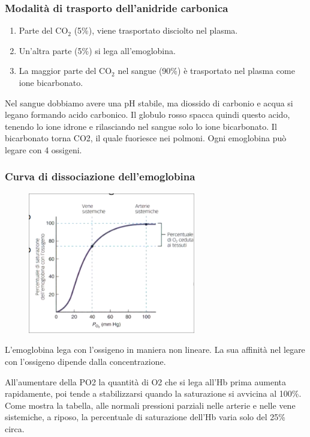 \documentclass[a4paper]{article}
\begin{document}
\subsubsection{Modalità di trasporto dell'anidride carbonica}

\begin{enumerate}
    \item Parte del CO\({}_2\) (5\%), viene trasportato disciolto nel plasma.
    \item Un'altra parte (5\%) si lega all'emoglobina.
    \item La maggior parte del CO\({}_2\) nel sangue (90\%) è trasportato nel plasma come ione bicarbonato. 
\end{enumerate}

Nel sangue dobbiamo avere una pH stabile, ma diossido di carbonio e acqua
si legano formando acido carbonico. Il globulo rosso spacca quindi questo acido,
tenendo lo ione idrone e rilasciando nel sangue solo lo ione bicarbonato.
Il bicarbonato torna CO2, il quale fuoriesce nei polmoni.
Ogni emoglobina può legare con 4 ossigeni.

\subsubsection{Curva di dissociazione dell'emoglobina}

\begin{figure}[ht]
    \centering
    \includegraphics[width=0.65\textwidth]{./emoglobina.png}
\end{figure}

L'emoglobina lega con l'ossigeno in maniera non lineare.
La sua affinità nel legare con l'ossigeno dipende dalla concentrazione.

All'aumentare della PO2 la quantità di O2 che si lega all'Hb
prima aumenta rapidamente, poi tende a stabilizzarsi quando la saturazione si avvicina al 100\%.
Come mostra la tabella, alle normali pressioni parziali nelle
arterie e nelle vene sistemiche, a riposo, la percentuale di saturazione dell'Hb varia solo del 25\% circa.
\end{document}
